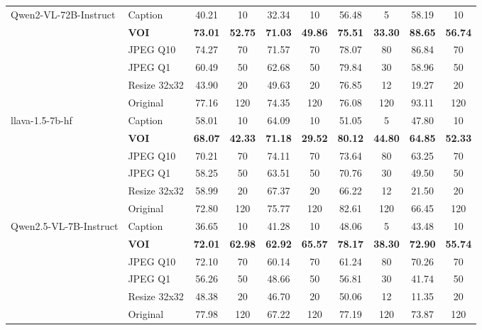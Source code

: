 \begin{table}[p]
{\begin{tabular}{llcccccccc}
\multirow{6}{*}{Qwen2-VL-72B-Instruct}
& Caption & 40.21 & 10 & 32.34 & 10 & 56.48 & 5 & 58.19 & 10 \\
& \textbf{VOI} & \textbf{73.01} & \textbf{52.75} & \textbf{71.03} & \textbf{49.86} & \textbf{75.51} & \textbf{33.30} & \textbf{88.65} & \textbf{56.74} \\
& JPEG Q10 & 74.27 & 70 & 71.57 & 70 & 78.07 & 80 & 86.84 & 70 \\
& JPEG Q1 & 60.49 & 50 & 62.68 & 50 & 79.84 & 30 & 58.96 & 50 \\
& Resize 32x32 & 43.90 & 20 & 49.63 & 20 & 76.85 & 12 & 19.27 & 20 \\
& Original & 77.16 & 120 & 74.35 & 120 & 76.08 & 120 & 93.11 & 120 \\
\midrule

\multirow{6}{*}{llava-1.5-7b-hf}
& Caption & 58.01 & 10 & 64.09 & 10 & 51.05 & 5 & 47.80 & 10 \\
& \textbf{VOI} & \textbf{68.07} & \textbf{42.33} & \textbf{71.18} & \textbf{29.52} & \textbf{80.12} & \textbf{44.80} & \textbf{64.85} & \textbf{52.33} \\
& JPEG Q10 & 70.21 & 70 & 74.11 & 70 & 73.64 & 80 & 63.25 & 70 \\
& JPEG Q1 & 58.25 & 50 & 63.51 & 50 & 70.76 & 30 & 49.50 & 50 \\
& Resize 32x32 & 58.99 & 20 & 67.37 & 20 & 66.22 & 12 & 21.50 & 20 \\
& Original & 72.80 & 120 & 75.77 & 120 & 82.61 & 120 & 66.45 & 120 \\
\midrule

\multirow{6}{*}{Qwen2.5-VL-7B-Instruct}
& Caption & 36.65 & 10 & 41.28 & 10 & 48.06 & 5 & 43.48 & 10 \\
& \textbf{VOI} & \textbf{72.01} & \textbf{62.98} & \textbf{62.92} & \textbf{65.57} & \textbf{78.17} & \textbf{38.30} & \textbf{72.90} & \textbf{55.74} \\
& JPEG Q10 & 72.10 & 70 & 60.14 & 70 & 61.24 & 80 & 70.26 & 70 \\
& JPEG Q1 & 56.26 & 50 & 48.66 & 50 & 56.81 & 30 & 41.74 & 50 \\
& Resize 32x32 & 48.38 & 20 & 46.70 & 20 & 50.06 & 12 & 11.35 & 20 \\
& Original & 77.98 & 120 & 67.22 & 120 & 77.19 & 120 & 73.87 & 120 \\
\midrule


\end{tabular}}
\end{table}
